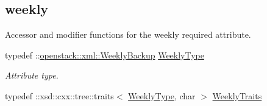 \subsection*{weekly}
\label{_amgrp4a11fc05ed694c195f0703605b64da90}
Accessor and modifier functions for the weekly required attribute. \begin{DoxyCompactItemize}
\item 
\hypertarget{classopenstack_1_1xml_1_1BackupSchedule_a530c9436ac48c4fb34d0424b016a7230}{
typedef ::\hyperlink{classopenstack_1_1xml_1_1WeeklyBackup}{openstack::xml::WeeklyBackup} \hyperlink{classopenstack_1_1xml_1_1BackupSchedule_a530c9436ac48c4fb34d0424b016a7230}{WeeklyType}}
\label{classopenstack_1_1xml_1_1BackupSchedule_a530c9436ac48c4fb34d0424b016a7230}

\begin{DoxyCompactList}\small\item\em Attribute type. \item\end{DoxyCompactList}\item 
\hypertarget{classopenstack_1_1xml_1_1BackupSchedule_ae974753b4cb20c5fa74b40c42ef1a1f5}{
typedef ::xsd::cxx::tree::traits$<$ \hyperlink{classopenstack_1_1xml_1_1WeeklyBackup}{WeeklyType}, char $>$ \hyperlink{classopenstack_1_1xml_1_1BackupSchedule_ae974753b4cb20c5fa74b40c42ef1a1f5}{WeeklyTraits}}
\label{classopenstack_1_1xml_1_1BackupSchedule_ae974753b4cb20c5fa74b40c42ef1a1f5}


\end{DoxyCompactItemize}
